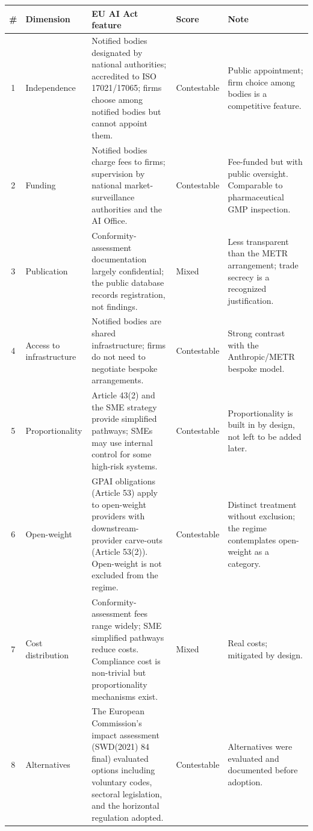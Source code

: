 \begin{table}[H]
\centering
\small
\begin{tabularx}{\textwidth}{@{}c l X l X@{}}
\toprule
\# & Dimension & EU AI Act feature & Score & Note \\
\midrule
1 & Independence & Notified bodies designated by national authorities; accredited to ISO 17021/17065; firms choose among notified bodies but cannot appoint them. & Contestable & Public appointment; firm choice among bodies is a competitive feature. \\
2 & Funding & Notified bodies charge fees to firms; supervision by national market-surveillance authorities and the AI Office. & Contestable & Fee-funded but with public oversight. Comparable to pharmaceutical GMP inspection. \\
3 & Publication & Conformity-assessment documentation largely confidential; the public database records registration, not findings. & Mixed & Less transparent than the METR arrangement; trade secrecy is a recognized justification. \\
4 & Access to infrastructure & Notified bodies are shared infrastructure; firms do not need to negotiate bespoke arrangements. & Contestable & Strong contrast with the Anthropic/METR bespoke model. \\
5 & Proportionality & Article 43(2) and the SME strategy provide simplified pathways; SMEs may use internal control for some high-risk systems. & Contestable & Proportionality is built in by design, not left to be added later. \\
6 & Open-weight & GPAI obligations (Article 53) apply to open-weight providers with downstream-provider carve-outs (Article 53(2)). Open-weight is not excluded from the regime. & Contestable & Distinct treatment without exclusion; the regime contemplates open-weight as a category. \\
7 & Cost distribution & Conformity-assessment fees range widely; SME simplified pathways reduce costs. Compliance cost is non-trivial but proportionality mechanisms exist. & Mixed & Real costs; mitigated by design. \\
8 & Alternatives & The European Commission's impact assessment (SWD(2021) 84 final) evaluated options including voluntary codes, sectoral legislation, and the horizontal regulation adopted. & Contestable & Alternatives were evaluated and documented before adoption. \\
\bottomrule
\end{tabularx}
\end{table}

